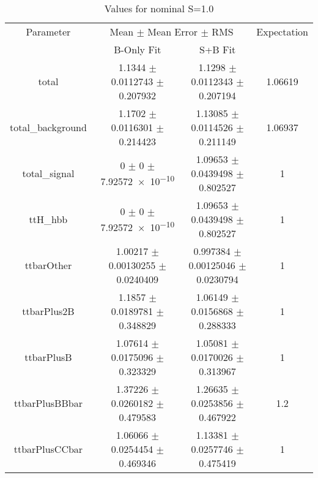 \begin{table}
\centering
\caption{Values for nominal S=1.0}
\begin{tabular}{cccc}
\toprule
Parameter & \multicolumn{2}{c}{Mean $\pm$ Mean Error $\pm$ RMS} & Expectation\\
 & B-Only Fit & S+B Fit & \\
\midrule
total & \num{1.1344} $\pm$ \num{0.0112743} $\pm$ \num{0.207932} & \num{1.1298} $\pm$ \num{0.0112343} $\pm$ \num{0.207194} & \num{1.06619}\\
total\_background & \num{1.1702} $\pm$ \num{0.0116301} $\pm$ \num{0.214423} & \num{1.13085} $\pm$ \num{0.0114526} $\pm$ \num{0.211149} & \num{1.06937}\\
total\_signal & \num{0} $\pm$ \num{0} $\pm$ \num{7.92572e-10} & \num{1.09653} $\pm$ \num{0.0439498} $\pm$ \num{0.802527} & \num{1}\\
ttH\_hbb & \num{0} $\pm$ \num{0} $\pm$ \num{7.92572e-10} & \num{1.09653} $\pm$ \num{0.0439498} $\pm$ \num{0.802527} & \num{1}\\
ttbarOther & \num{1.00217} $\pm$ \num{0.00130255} $\pm$ \num{0.0240409} & \num{0.997384} $\pm$ \num{0.00125046} $\pm$ \num{0.0230794} & \num{1}\\
ttbarPlus2B & \num{1.1857} $\pm$ \num{0.0189781} $\pm$ \num{0.348829} & \num{1.06149} $\pm$ \num{0.0156868} $\pm$ \num{0.288333} & \num{1}\\
ttbarPlusB & \num{1.07614} $\pm$ \num{0.0175096} $\pm$ \num{0.323329} & \num{1.05081} $\pm$ \num{0.0170026} $\pm$ \num{0.313967} & \num{1}\\
ttbarPlusBBbar & \num{1.37226} $\pm$ \num{0.0260182} $\pm$ \num{0.479583} & \num{1.26635} $\pm$ \num{0.0253856} $\pm$ \num{0.467922} & \num{1.2}\\
ttbarPlusCCbar & \num{1.06066} $\pm$ \num{0.0254454} $\pm$ \num{0.469346} & \num{1.13381} $\pm$ \num{0.0257746} $\pm$ \num{0.475419} & \num{1}\\
\bottomrule
\end{tabular}
\end{table}